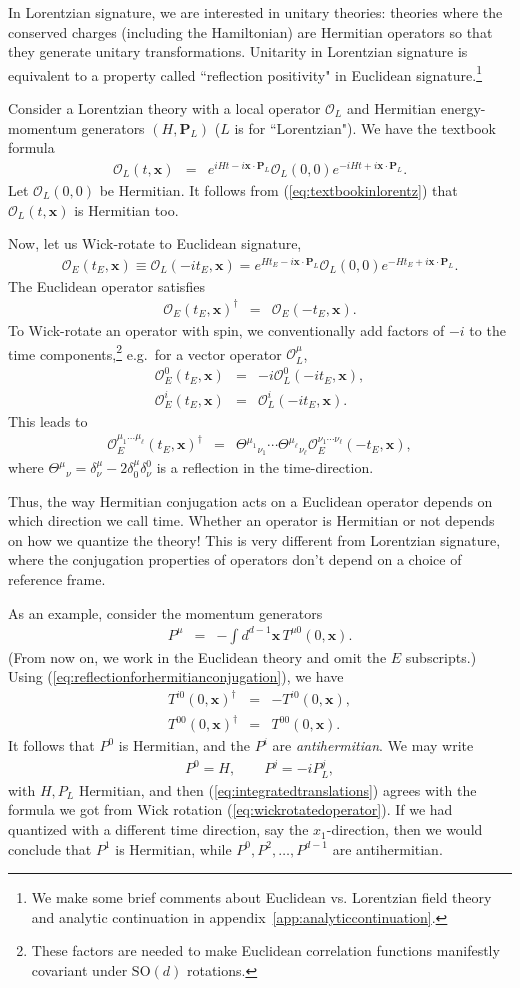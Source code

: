 \documentclass[11pt]{ws-rv9x6}
\newcommand\be{\begin{eqnarray}}
\newcommand\ee{\end{eqnarray}}
\newcommand\cO{\mathcal{O}}
\newcommand\<\langle
\renewcommand\>\rangle
\newcommand\de\delta
\newcommand\bx{\mathbf{x}}
\newcommand\nn{\nonumber}
\renewcommand\.{\cdot}
\newcommand\SO{\mathrm{SO}}
\newcommand\bP{\mathbf{P}}
\begin{document}
In Lorentzian signature, we are interested in unitary theories: theories where the conserved charges (including the Hamiltonian) are Hermitian operators so that they generate unitary transformations.  Unitarity in Lorentzian signature is equivalent to a property called ``reflection positivity" in Euclidean signature.\footnote{We make some brief comments about Euclidean vs. Lorentzian field theory and analytic continuation in appendix~\ref{app:analyticcontinuation}.}

Consider a Lorentzian theory with a local operator $\cO_L$ and Hermitian energy-momentum generators $(H,\bP_L)$ ($L$ is for ``Lorentzian").  We have the textbook formula
\be
\label{eq:textbookinlorentz}
\cO_L(t,\bx) &=& e^{iHt-i\bx\.\bP_L}\cO_L(0,0)e^{-iHt+i\bx\.\bP_L}.
\ee
Let $\cO_L(0,0)$ be Hermitian.  It follows from (\ref{eq:textbookinlorentz}) that $\cO_L(t,\bx)$ is Hermitian too.

Now, let us Wick-rotate to Euclidean signature,
\be
\label{eq:wickrotatedoperator}
\cO_E(t_E,\bx) \equiv \cO_L(-it_E,\bx)
= e^{Ht_E-i\bx\.\bP_L}\cO_L(0,0)e^{-Ht_E+i\bx\.\bP_L}.
\ee
The Euclidean operator satisfies
\be
\cO_E(t_E,\bx)^\dag &=& \cO_E(-t_E,\bx).
\ee
To Wick-rotate an operator with spin, we conventionally add factors of $-i$ to the time components,\footnote{These factors are needed to make Euclidean correlation functions manifestly covariant under $\SO(d)$ rotations.} e.g.\ for a vector operator $\cO_L^\mu$,
\be
\cO_E^0(t_E,\bx) &=& -i \cO_L^0(-it_E,\bx),\nn\\
\cO_E^i(t_E,\bx) &=& \cO_L^i(-it_E,\bx).
\ee
This leads to
\be
\label{eq:reflectionforhermitianconjugation}
\cO_E^{\mu_1\dots\mu_\ell}(t_E,\bx)^\dag &=& \Theta^{\mu_1}{}_{\nu_1}\cdots \Theta^{\mu_\ell}{}_{\nu_\ell} \cO_E^{\nu_1\cdots\nu_\ell}(-t_E,\bx),
\ee
where $\Theta^\mu{}_\nu = \de^\mu_\nu-2\de^\mu_0\de_\nu^0$ is a reflection in the time-direction.

Thus, the way Hermitian conjugation acts on a Euclidean operator depends on which direction we call time.  Whether an operator is Hermitian or not depends on how we quantize the theory! This is very different from Lorentzian signature, where the conjugation properties of operators don't depend on a choice of reference frame.

As an example, consider the momentum generators
\be
P^\mu &=& -\int d^{d-1}\bx\, T^{\mu 0}(0,\bx).
\ee
(From now on, we work in the Euclidean theory and omit the $E$ subscripts.)
Using (\ref{eq:reflectionforhermitianconjugation}), we have
\be
T^{i 0}(0,\bx)^\dag &=& -T^{i0}(0,\bx),\nn\\
T^{00}(0,\bx)^\dag &=& T^{00}(0,\bx).
\ee
It follows that $P^0$ is Hermitian, and the $P^i$ are {\it antihermitian}.  We may write
\be
P^0 = H,\qquad
P^j = -iP^j_L,
\ee
with $H,P_L$ Hermitian, and then (\ref{eq:integratedtranslations}) agrees with the formula we got from Wick rotation (\ref{eq:wickrotatedoperator}).  If we had quantized with a different time direction, say the $x_1$-direction, then we would conclude that $P^1$ is Hermitian, while $P^0,P^2,\dots,P^{d-1}$ are antihermitian.
\end{document}
